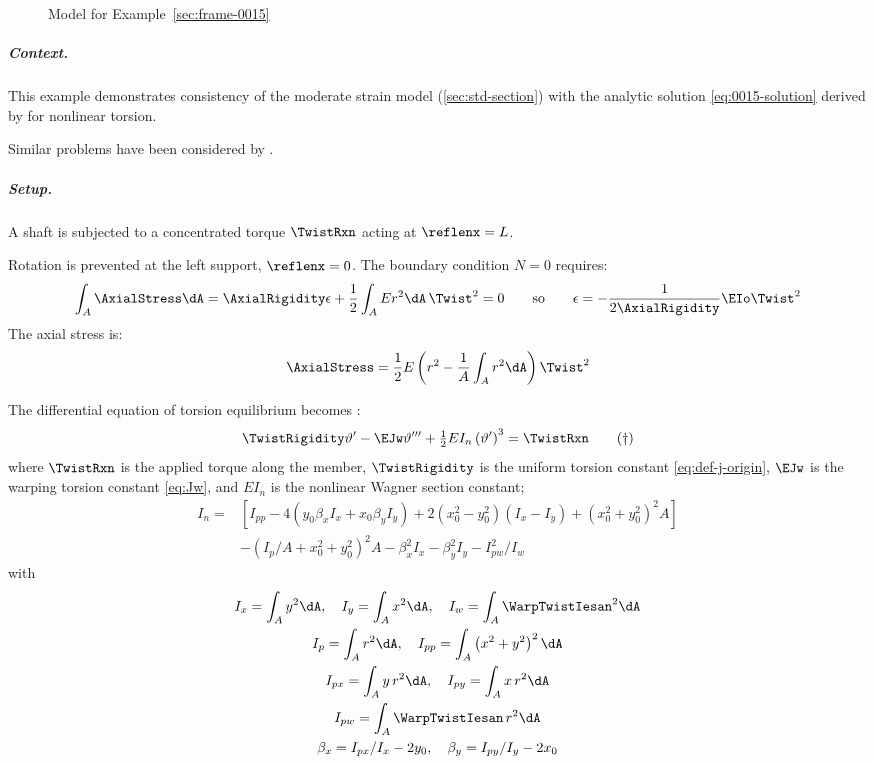 \begin{figure}[H]
    \centering
    \caption{Model for Example~\ref{sec:frame-0015}}
    \label{fig:frame-0015}
\end{figure}

\subparagraph{Context.}
This example demonstrates consistency of the moderate strain model (\cref{sec:std-section}) with the analytic solution \eqref{eq:0015-solution} derived by \cite{trahair2005nonlinear} for nonlinear torsion.

Similar problems have been considered by 
\cite{hsiao2000corotational,battini2002corotational,jonker2021threedimensional} \cite{rong2020geometrically} \cite{zhang2011formulation}.

\subparagraph{Setup.}
A shaft is subjected to a concentrated torque $\TwistRxn$ acting at $\reflenx=L$. 
\begin{Details}
Rotation is prevented at the left support, $\reflenx=0$. 
The boundary condition \(N=0\) requires:
$$
\int_A \AxialStress \dA
=\AxialRigidity\epsilon + \frac{1}{2} \int_A E r^2 \dA \,\Twist^2 =0
\qquad\text{so}\qquad 
\epsilon = -\frac{1}{2\AxialRigidity} \EIo \Twist^2
$$
The axial stress is:
$$
\AxialStress=\frac{1}{2} E\left(r^2-\frac{1}{A} \int_A r^2 \dA \right)\Twist^2
$$
\end{Details}
The differential equation of torsion equilibrium becomes \citep{trahair2005nonlinear}:
%
\begin{equation}
\TwistRigidity \vartheta' - \EJw \vartheta''' + \tfrac{1}{2} E I_n\left(\vartheta'\right)^3 = \TwistRxn
\tag{$\dagger$}
\end{equation}
%
where $\TwistRxn$ is the applied torque along the member, $\TwistRigidity$ is the uniform torsion constant \eqref{eq:def-j-origin}, $\EJw$ is the warping torsion constant \eqref{eq:Jw}, and $EI_n$ is the  nonlinear Wagner section constant;
$$
\begin{aligned}
I_n= & {\left[I_{p p}-4\left(y_0 \beta_x I_x+x_0 \beta_y I_y\right)+2\left(x_0^2-y_0^2\right)\left(I_x-I_y\right)+\left(x_0^2+y_0^2\right)^2 A\right] } \\
& -\left(I_p / A+x_0^2+y_0^2\right)^2 A-\beta_x^2 I_x-\beta_y^2 I_y-I_{p w}^2 / I_w
\end{aligned}
$$
with
$$
\begin{gathered}
I_x=\int_A y^2 \dA, 
\quad I_y=\int_A x^2 \dA, 
\quad I_w=\int_A \WarpTwistIesan^2 \dA \\
I_p=\int_A r^2 \dA, 
\quad I_{p p}=\int_A\left(x^2+y^2\right)^2 \dA \\
I_{p x}=\int_A y\,r^2 \dA, 
\quad I_{p y}=\int_A x \, r^2 \dA \\
I_{p w}=\int_A \WarpTwistIesan\, r^2 \dA \\
\beta_x=I_{p x} / I_x-2 y_0, 
\quad \beta_y=I_{p y} / I_y-2 x_0
\end{gathered}
$$

